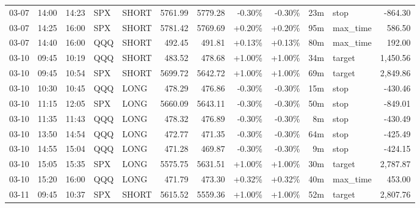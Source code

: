 \documentclass[11pt,a4paper]{article}
\begin{document}
\begin{center}
\begin{longtable}{>{\color{txtmain}}l l l l l r r r r r >{\color{txtmain}}l r}
03-07 & 14:00 & 14:23 & SPX & SHORT & 5761.99 & 5779.28 & \textcolor{lossred}{-0.30\%} & \textcolor{lossred}{-0.30\%} & 23m & stop & \textcolor{lossred}{-864.30} \\
03-07 & 14:25 & 16:00 & SPX & SHORT & 5781.42 & 5769.69 & \textcolor{wingreen}{+0.20\%} & \textcolor{wingreen}{+0.20\%} & 95m & max\_time & \textcolor{wingreen}{586.50} \\
03-07 & 14:40 & 16:00 & QQQ & SHORT & 492.45 & 491.81 & \textcolor{wingreen}{+0.13\%} & \textcolor{wingreen}{+0.13\%} & 80m & max\_time & \textcolor{wingreen}{192.00} \\
03-10 & 09:45 & 10:19 & QQQ & SHORT & 483.52 & 478.68 & \textcolor{wingreen}{+1.00\%} & \textcolor{wingreen}{+1.00\%} & 34m & target & \textcolor{wingreen}{1,450.56} \\
03-10 & 09:45 & 10:54 & SPX & SHORT & 5699.72 & 5642.72 & \textcolor{wingreen}{+1.00\%} & \textcolor{wingreen}{+1.00\%} & 69m & target & \textcolor{wingreen}{2,849.86} \\
03-10 & 10:30 & 10:45 & QQQ & LONG & 478.29 & 476.86 & \textcolor{lossred}{-0.30\%} & \textcolor{lossred}{-0.30\%} & 15m & stop & \textcolor{lossred}{-430.46} \\
03-10 & 11:15 & 12:05 & SPX & LONG & 5660.09 & 5643.11 & \textcolor{lossred}{-0.30\%} & \textcolor{lossred}{-0.30\%} & 50m & stop & \textcolor{lossred}{-849.01} \\
03-10 & 11:35 & 11:43 & QQQ & LONG & 478.32 & 476.89 & \textcolor{lossred}{-0.30\%} & \textcolor{lossred}{-0.30\%} & 8m & stop & \textcolor{lossred}{-430.49} \\
03-10 & 13:50 & 14:54 & QQQ & LONG & 472.77 & 471.35 & \textcolor{lossred}{-0.30\%} & \textcolor{lossred}{-0.30\%} & 64m & stop & \textcolor{lossred}{-425.49} \\
03-10 & 14:55 & 15:04 & QQQ & LONG & 471.28 & 469.87 & \textcolor{lossred}{-0.30\%} & \textcolor{lossred}{-0.30\%} & 9m & stop & \textcolor{lossred}{-424.15} \\
03-10 & 15:05 & 15:35 & SPX & LONG & 5575.75 & 5631.51 & \textcolor{wingreen}{+1.00\%} & \textcolor{wingreen}{+1.00\%} & 30m & target & \textcolor{wingreen}{2,787.87} \\
03-10 & 15:20 & 16:00 & QQQ & LONG & 471.79 & 473.30 & \textcolor{wingreen}{+0.32\%} & \textcolor{wingreen}{+0.32\%} & 40m & max\_time & \textcolor{wingreen}{453.00} \\
03-11 & 09:45 & 10:37 & SPX & SHORT & 5615.52 & 5559.36 & \textcolor{wingreen}{+1.00\%} & \textcolor{wingreen}{+1.00\%} & 52m & target & \textcolor{wingreen}{2,807.76} \\

\end{longtable}
\end{center}
\end{document}
